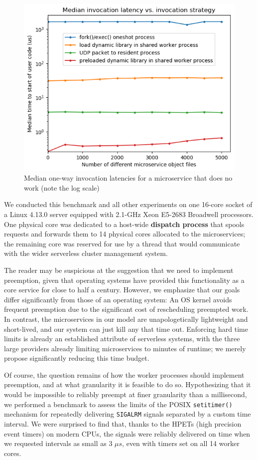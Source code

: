 \begin{figure}
\includegraphics[width=\columnwidth]{figs/2018-02-02-motivation_numfuns-latency-reordered}
\caption{Median one-way invocation latencies for a microservice that does no work (note the log scale)}
\label{fig:motive}
\end{figure}

We conducted this benchmark and all other experiments on one 16-core socket of a
Linux 4.13.0 server equipped with 2.1-GHz Xeon E5-2683 Broadwell processors.  One
physical core was dedicated to a host-wide \textbf{dispatch process} that spools
requests and forwards them to 14 physical cores allocated to the microservices; the
remaining core was reserved for use by a thread that would communicate with the wider
serverless cluster management system.


The reader may be suspicious at the suggestion that we need to implement preemption,
given that operating systems have provided this functionality as a core service for
close to half a century.  However, we emphasize that our goals differ significantly
from those of an operating system:  An OS kernel avoids frequent preemption due to
the significant cost of rescheduling preempted work.  In contrast, the microservices
in our model are unapologetically lightweight and short-lived, and our system can
just kill any that time out.  Enforcing hard time limits is already an established
attribute of serverless systems, with the three large providers already limiting
microservices to minutes of runtime; we merely propose significantly reducing this
time budget.

Of course, the question remains of how the worker processes should implement
preemption, and at what granularity it is feasible to do so.  Hypothesizing that it
would be impossible to reliably preempt at finer granularity than a millisecond, we
performed a benchmark to assess the limits of the POSIX \texttt{setitimer()}
mechanism for repeatedly delivering \texttt{SIGALRM} signals separated by a custom
time interval.  We were surprised to find that, thanks to the HPETs (high precision
event timers) on modern CPUs, the signals were reliably delivered on time when we
requested intervals as small as 3 $\mu{}s$, even with timers set on all 14 worker
cores.
